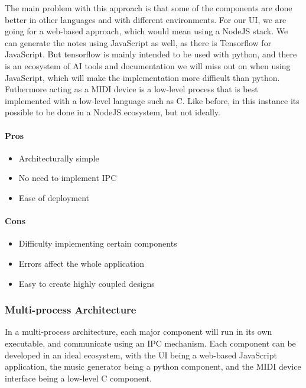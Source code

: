 The main problem with this approach is that some of the components are done better in
other languages and with different environments. For our UI, we are going for a web-based
approach, which would mean using a NodeJS stack. We can generate the notes using
JavaScript as well, as there is Tensorflow for JavaScript. But tensorflow is mainly
intended to be used with python, and there is an ecosystem of AI tools and documentation
we will miss out on when using JavaScript, which will make the implementation more
difficult than python. Futhermore acting as a MIDI device is a low-level process that is
best implemented with a low-level language such as C. Like before, in this instance its
possible to be done in a NodeJS ecosystem, but not ideally.

\paragraph{Pros}

\begin{itemize}
  \item Architecturally simple
  \item No need to implement IPC
  \item Ease of deployment
\end{itemize}

\paragraph{Cons}

\begin{itemize}
  \item Difficulty implementing certain components
  \item Errors affect the whole application
  \item Easy to create highly coupled designs
\end{itemize}

\subsubsection{Multi-process Architecture}

In a multi-process architecture, each major component will run in its own executable, and
communicate using an IPC mechanism. Each component can be developed in an ideal ecosystem,
with the UI being a web-based JavaScript application, the music generator being a python
component, and the MIDI device interface being a low-level C component.

